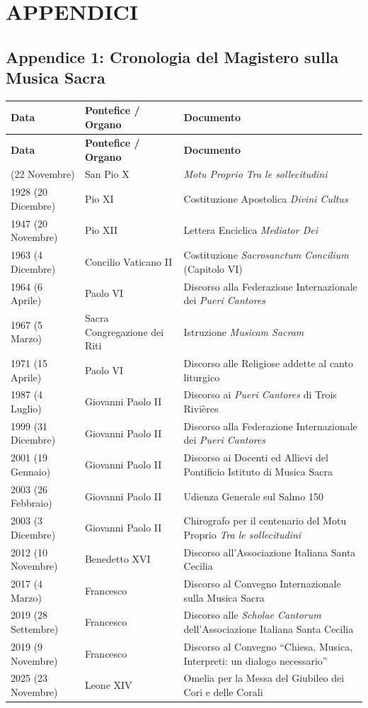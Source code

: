 \documentclass[12pt,a4paper]{article}
\begin{document}
	\section{APPENDICI}\label{appendici}
	
	\subsection{Appendice 1: Cronologia del Magistero sulla Musica Sacra}\label{appendice-1-cronologia-del-magistero-sulla-musica-sacra}
	
	\begin{longtable}{L{3cm}L{4.5cm}L{7cm}}
		\toprule
		\textbf{Data} & \textbf{Pontefice / Organo} & \textbf{Documento} \\
		\midrule
		\endfirsthead
		\toprule
		\textbf{Data} & \textbf{Pontefice / Organo} & \textbf{Documento} \\
		\midrule
		\endhead
		\bottomrule
		 (22 Novembre) & San Pio X & \emph{Motu Proprio Tra le sollecitudini} \\
		1928 (20 Dicembre) & Pio XI & Costituzione Apostolica \emph{Divini Cultus} \\
		1947 (20 Novembre) & Pio XII & Lettera Enciclica \emph{Mediator Dei} \\
		1963 (4 Dicembre) & Concilio Vaticano II & Costituzione \emph{Sacrosanctum Concilium} (Capitolo VI) \\
		1964 (6 Aprile) & Paolo VI & Discorso alla Federazione Internazionale dei \emph{Pueri Cantores} \\
		1967 (5 Marzo) & Sacra Congregazione dei Riti & Istruzione \emph{Musicam Sacram} \\
		1971 (15 Aprile) & Paolo VI & Discorso alle Religiose addette al canto liturgico \\
		1987 (4 Luglio) & Giovanni Paolo II & Discorso ai \emph{Pueri Cantores} di Trois Rivières \\
		1999 (31 Dicembre) & Giovanni Paolo II & Discorso alla Federazione Internazionale dei \emph{Pueri Cantores} \\
		2001 (19 Gennaio) & Giovanni Paolo II & Discorso ai Docenti ed Allievi del Pontificio Istituto di Musica Sacra \\
		2003 (26 Febbraio) & Giovanni Paolo II & Udienza Generale sul Salmo 150 \\
		2003 (3 Dicembre) & Giovanni Paolo II & Chirografo per il centenario del Motu Proprio \emph{Tra le sollecitudini} \\
		2012 (10 Novembre) & Benedetto XVI & Discorso all'Associazione Italiana Santa Cecilia \\
		2017 (4 Marzo) & Francesco & Discorso al Convegno Internazionale sulla Musica Sacra \\
		2019 (28 Settembre) & Francesco & Discorso alle \emph{Scholae Cantorum} dell'Associazione Italiana Santa Cecilia \\
		2019 (9 Novembre) & Francesco & Discorso al Convegno ``Chiesa, Musica, Interpreti: un dialogo necessario'' \\
		2025 (23 Novembre) & Leone XIV & Omelia per la Messa del Giubileo dei Cori e delle Corali \\
	\end{longtable}
	
\end{document}

